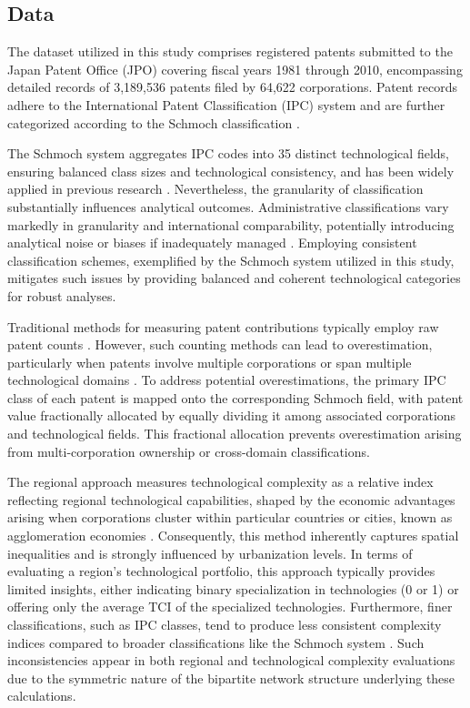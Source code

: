 \subsection*{Data}
{}
\label{subsection:Data}

The dataset utilized in this study comprises registered patents submitted to the Japan Patent Office (JPO) covering fiscal years 1981 through 2010, encompassing detailed records of 3,189,536 patents filed by 64,622 corporations. Patent records adhere to the International Patent Classification (IPC) system and are further categorized according to the Schmoch classification \cite{Schmoch2008}.

The Schmoch system aggregates IPC codes into 35 distinct technological fields, ensuring balanced class sizes and technological consistency, and has been widely applied in previous research \cite{PintarScherngell2022,Balland2018,Whittle2019}. Nevertheless, the granularity of classification substantially influences analytical outcomes. Administrative classifications vary markedly in granularity and international comparability, potentially introducing analytical noise or biases if inadequately managed \cite{Hidalgo2021}. Employing consistent classification schemes, exemplified by the Schmoch system utilized in this study, mitigates such issues by providing balanced and coherent technological categories for robust analyses.

Traditional methods for measuring patent contributions typically employ raw patent counts \cite{Balland2016,Balland2018,PintarScherngell2022,Pinheiro2022,Whittle2019,Jun2023,Abay2024}. However, such counting methods can lead to overestimation, particularly when patents involve multiple corporations or span multiple technological domains \cite{PintarScherngell2022}. To address potential overestimations, the primary IPC class of each patent is mapped onto the corresponding Schmoch field, with patent value fractionally allocated by equally dividing it among associated corporations and technological fields. This fractional allocation prevents overestimation arising from multi-corporation ownership or cross-domain classifications.

The regional approach measures technological complexity as a relative index reflecting regional technological capabilities, shaped by the economic advantages arising when corporations cluster within particular countries or cities, known as agglomeration economies \cite{hartmann2024economic}. 
Consequently, this method inherently captures spatial inequalities and is strongly influenced by urbanization levels. 
In terms of evaluating a region’s technological portfolio, this approach typically provides limited insights, either indicating binary specialization in technologies (0 or 1) or offering only the average TCI of the specialized technologies. Furthermore, finer classifications, such as IPC classes, tend to produce less consistent complexity indices compared to broader classifications like the Schmoch system \cite{PintarEssletzbichler2022}.
Such inconsistencies appear in both regional and technological complexity evaluations due to the symmetric nature of the bipartite network structure underlying these calculations.

